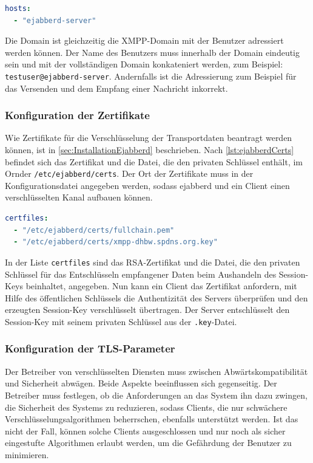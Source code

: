 \documentclass[a4paper,titlepage,halfparskip,12pt]{scrreprt}
\begin{document}
\begin{onehalfspacing}
\bigskip

\begin{lstlisting}[language=yaml, caption={Konfiguration der Domains},label={lst:configHosts}]
hosts:
  - "ejabberd-server"
\end{lstlisting}

Die Domain ist gleichzeitig die \ac{XMPP}-Domain mit der Benutzer adressiert werden können. Der Name des Benutzers muss innerhalb der Domain eindeutig sein und mit der vollständigen Domain konkateniert werden, zum Beispiel: \texttt{testuser@ejabberd-server}. Andernfalls ist die Adressierung zum Beispiel für das Versenden und dem Empfang einer Nachricht inkorrekt.


\subsubsection*{Konfiguration der Zertifikate}

Wie Zertifikate für die Verschlüsselung der Transportdaten beantragt werden können, ist in \autoref{sec:InstallationEjabberd} beschrieben. Nach \autoref{lst:ejabberdCerts} befindet sich das Zertifikat und die Datei, die den privaten Schlüssel enthält, im Ornder \texttt{/etc/ejabberd/certs}. Der Ort der Zertifikate muss in der Konfigurationsdatei angegeben werden, sodass ejabberd und ein Client einen verschlüsselten Kanal aufbauen können.

\bigskip

\begin{lstlisting}[language=yaml, caption={Konfiguration der Zertifikate}]
certfiles:
  - "/etc/ejabberd/certs/fullchain.pem"
  - "/etc/ejabberd/certs/xmpp-dhbw.spdns.org.key"
\end{lstlisting}

In der Liste \texttt{certfiles} sind das \ac{RSA}-Zertifikat und die Datei, die den privaten Schlüssel für das Entschlüsseln empfangener Daten beim Aushandeln des Session-Keys beinhaltet, angegeben. Nun kann ein Client das Zertifikat anfordern, mit Hilfe des öffentlichen Schlüssels die Authentizität des Servers überprüfen und den erzeugten Session-Key verschlüsselt übertragen. Der Server entschlüsselt den Session-Key mit seinem privaten Schlüssel aus der \texttt{.key}-Datei.

\subsubsection*{Konfiguration der \ac{TLS}-Parameter}

Der Betreiber von verschlüsselten Diensten muss zwischen Abwärtskompatibilität und Sicherheit abwägen. Beide Aspekte beeinflussen sich gegenseitig. Der Betreiber muss festlegen, ob die Anforderungen an das System ihn dazu zwingen, die Sicherheit des Systems zu reduzieren, sodass Clients, die nur schwächere Verschlüsselungsalgorithmen beherrschen, ebenfalls unterstützt werden. Ist das nicht der Fall, können solche Clients ausgeschlossen und nur noch als sicher eingestufte Algorithmen erlaubt werden, um die Gefährdung der Benutzer zu minimieren.\cite{melzer2010web}


\end{onehalfspacing}
\end{document}
